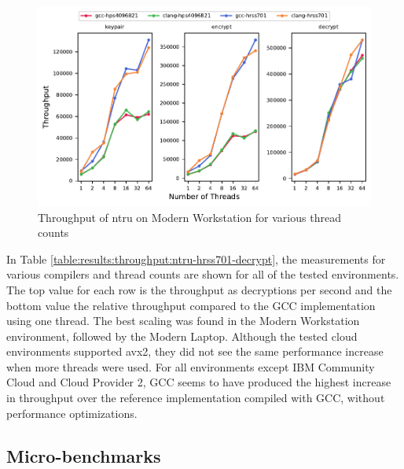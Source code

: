 \begin{figure}
    \centering
    \includegraphics[scale=0.75]{chapters/results/throughput/Modern Workstation_ntru.pdf}
    \caption{Throughput of \gls{ntru} on Modern Workstation for various thread counts}
    \label{figure:results:throughput:ntru-modern-workstation}
\end{figure}

In Table \ref{table:results:throughput:ntru-hrss701-decrypt}, the measurements for various compilers and thread counts are shown for all of the tested environments. The top value for each row is the throughput as decryptions per second and the bottom value the relative throughput compared to the GCC implementation using one thread. The best scaling was found in the Modern Workstation environment, followed by the Modern Laptop. Although the tested cloud environments supported \gls{avx2}, they did not see the same performance increase when more threads were used. For all environments except IBM Community Cloud and Cloud Provider 2, GCC seems to have produced the highest increase in throughput over the reference implementation compiled with GCC, without performance optimizations.



\subsection{Micro-benchmarks}

